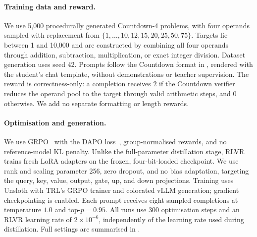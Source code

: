 \documentclass{article} %
\theoremstyle{plain}
\theoremstyle{definition}
\theoremstyle{remark}
\begin{document}
\paragraph{Training data and reward.}
We use 5,000 procedurally generated Countdown-4 problems, with four operands sampled with replacement from $\{1,\ldots,10,12,15,20,25,50,75\}$. Targets lie between 1 and 10,000 and are constructed by combining all four operands through addition, subtraction, multiplication, or exact integer division. Dataset generation uses seed 42. Prompts follow the Countdown format in , rendered with the student's chat template, without demonstrations or teacher supervision. The reward is correctness-only: a completion receives $2$ if the Countdown verifier reduces the operand pool to the target through valid arithmetic steps, and $0$ otherwise. We add no separate formatting or length rewards.

\paragraph{Optimisation and generation.}
We use GRPO~\citep{shao_deepseekmath_2024} with the DAPO loss~\citep{yu_dapo_2025}, group-normalised rewards, and no reference-model KL penalty. Unlike the full-parameter distillation stage, RLVR trains fresh LoRA adapters on the frozen, four-bit-loaded checkpoint. We use rank and scaling parameter 256, zero dropout, and no bias adaptation, targeting the query, key, value, output, gate, up, and down projections. Training uses Unsloth with TRL's GRPO trainer and colocated vLLM generation; gradient checkpointing is enabled. Each prompt receives eight sampled completions at temperature $1.0$ and top-$p=0.95$. All runs use 300 optimisation steps and an RLVR learning rate of $2\times10^{-6}$, independently of the learning rate used during distillation. Full settings are summarised in .
\end{document}
